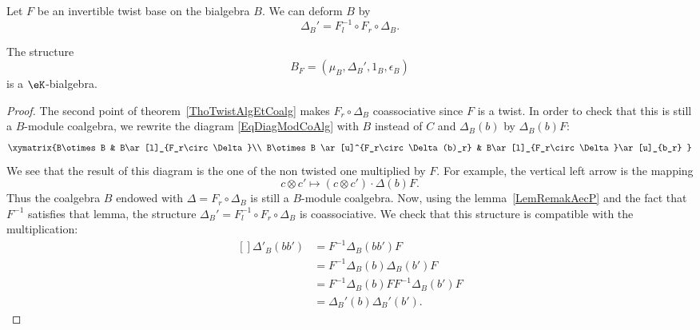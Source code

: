 Let $F$ be an invertible twist base on the bialgebra $B$. We can deform $B$ by
\begin{equation}
	 \Delta_B'=F^{-1}_l\circ F_r\circ\Delta_B.
\end{equation}

\begin{theorem}
	The structure
	\begin{equation}
		B_F=(\mu_B,\Delta_B',1_B,\epsilon_B)
	\end{equation}
	is a $\eK$-bialgebra.
\end{theorem}

\begin{proof}
	The second point of theorem~\ref{ThoTwistAlgEtCoalg} makes $F_r\circ\Delta_B$ coassociative since $F$ is a twist. In order to check that this is still a $B$-module coalgebra, we rewrite the diagram \eqref{EqDiagModCoAlg} with $B$ instead of $C$ and $\Delta_B(b)$ by $\Delta_B(b)F$:
\begin{equation}
	\xymatrix{%
	B\otimes B 		&	B\ar[l]_{F_r\circ\Delta}\\
	B\otimes B \ar[u]^{F_r\circ\Delta(b)_r}	&	B\ar[l]_{F_r\circ\Delta}\ar[u]_{b_r}
	   }
\end{equation}
	We see that the result of this diagram is the one of the non twisted one multiplied by $F$. For example, the vertical left arrow is the mapping
	\begin{equation}
		c\otimes c'\mapsto(c\otimes c')\cdot\Delta(b)F.
	\end{equation}
	Thus the coalgebra $B$ endowed with $\Delta=F_r\circ\Delta_B$ is still a $B$-module coalgebra. Now, using the lemma~\ref{LemRemakAecP} and the fact that $F^{-1}$ satisfies that lemma, the structure $\Delta_{B}'=F_l^{-1}\circ F_r\circ\Delta_B$ is coassociative. We check that this structure is compatible with the multiplication:
	\begin{equation}
		\begin{aligned}[]
			\Delta'_B(bb')&=F^{-1}\Delta_B(bb')F\\
					&=F^{-1}\Delta_B(b)\Delta_B(b')F\\
					&=F^{-1}\Delta_B(b)FF^{-1}\Delta_B(b')F\\
					&=\Delta_B'(b)\Delta_B'(b').
		\end{aligned}
	\end{equation}
\end{proof}


